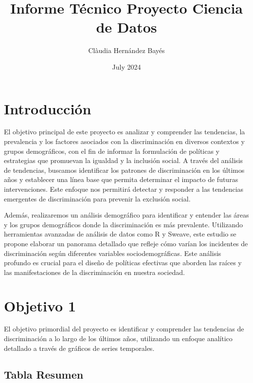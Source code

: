 \documentclass{article}
\title{Informe Técnico Proyecto Ciencia de Datos}
\author{Clàudia Hernández Bayés}
\date{July 2024}
\begin{document}


\maketitle
\tableofcontents


\section{Introducción}
El objetivo principal de este proyecto es analizar y comprender las tendencias, la prevalencia y los factores asociados con la discriminación en diversos contextos y grupos demográficos, con el fin de informar la formulación de políticas y estrategias que promuevan la igualdad y la inclusión social. A través del análisis de tendencias, buscamos identificar los patrones de discriminación en los últimos años y establecer una línea base que permita determinar el impacto de futuras intervenciones. Este enfoque nos permitirá detectar y responder a las tendencias emergentes de discriminación para prevenir la exclusión social.

Además, realizaremos un análisis demográfico para identificar y entender las áreas y los grupos demográficos donde la discriminación es más prevalente. Utilizando herramientas avanzadas de análisis de datos como R y Sweave, este estudio se propone elaborar un panorama detallado que refleje cómo varían los incidentes de discriminación según diferentes variables sociodemográficas. Este análisis profundo es crucial para el diseño de políticas efectivas que aborden las raíces y las manifestaciones de la discriminación en nuestra sociedad.


\section{Objetivo 1}
El objetivo primordial del proyecto es identificar y comprender las tendencias de discriminación a lo largo de los últimos años, utilizando un enfoque analítico detallado a través de gráficos de series temporales.

\subsection{Tabla Resumen}
\end{document}
